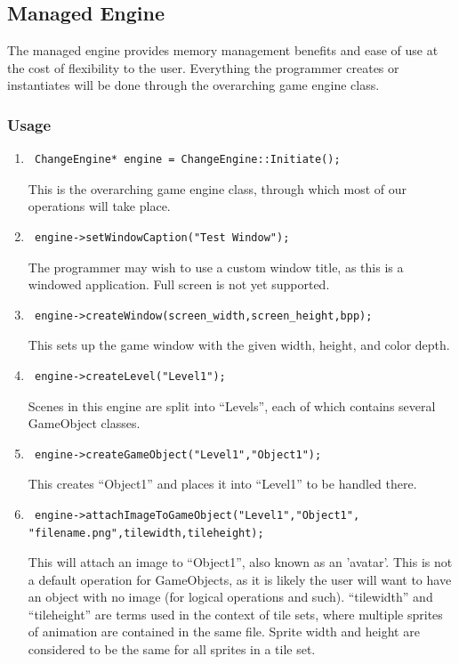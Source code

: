 \documentclass[12pt]{article}
\begin{document}
\subsection{Managed Engine}
The managed engine provides memory management benefits and ease of use at the cost of flexibility to the user. Everything the programmer creates or instantiates will be done through the overarching game engine class.

\subsubsection{Usage}
\begin{enumerate}
 \item \begin{verbatim} ChangeEngine* engine = ChangeEngine::Initiate(); \end{verbatim}
This is the overarching game engine class, through which most of our operations will take place.
 \item \begin{verbatim} engine->setWindowCaption("Test Window"); \end{verbatim}
The programmer may wish to use a custom window title, as this is a windowed application. Full screen is not yet supported.
 \item \begin{verbatim} engine->createWindow(screen_width,screen_height,bpp); \end{verbatim}
This sets up the game window with the given width, height, and color depth.
 \item \begin{verbatim} engine->createLevel("Level1"); \end{verbatim}
Scenes in this engine are split into ``Levels'', each of which contains several GameObject classes.
 \item \begin{verbatim} engine->createGameObject("Level1","Object1"); \end{verbatim}
This creates ``Object1'' and places it into ``Level1'' to be handled there.
 \item \begin{verbatim} engine->attachImageToGameObject("Level1","Object1",
"filename.png",tilewidth,tileheight); \end{verbatim}
This will attach an image to ``Object1'', also known as an 'avatar'. This is not a default operation for GameObjects, as it is likely the user will want to have an object with no image (for logical operations and such). ``tilewidth'' and ``tileheight'' are terms used in the context of tile sets, where multiple sprites of animation are contained in the same file. Sprite width and height are considered to be the same for all sprites in a tile set.

\end{enumerate}
\end{document}

